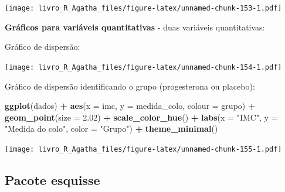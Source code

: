 \documentclass[
]{book}
\newenvironment{Shaded}{\begin{snugshade}}{\end{snugshade}}
\newcommand{\DataTypeTok}[1]{\textcolor[rgb]{0.13,0.29,0.53}{#1}}
\newcommand{\FloatTok}[1]{\textcolor[rgb]{0.00,0.00,0.81}{#1}}
\newcommand{\KeywordTok}[1]{\textcolor[rgb]{0.13,0.29,0.53}{\textbf{#1}}}
\newcommand{\NormalTok}[1]{#1}
\newcommand{\OperatorTok}[1]{\textcolor[rgb]{0.81,0.36,0.00}{\textbf{#1}}}
\newcommand{\StringTok}[1]{\textcolor[rgb]{0.31,0.60,0.02}{#1}}
\begin{document}
\texttt{[image: livro\_R\_Agatha\_files/figure-latex/unnamed-chunk-153-1.pdf]}

\textbf{Gráficos para variáveis quantitativas} - duas variáveis quantitativas:

Gráfico de dispersão:

\begin{Shaded}
\end{Shaded}

\texttt{[image: livro\_R\_Agatha\_files/figure-latex/unnamed-chunk-154-1.pdf]}

Gráfico de dispersão identificando o grupo (progesterona ou placebo):

\begin{Shaded}
\begin{Highlighting}[]
\KeywordTok{ggplot}\NormalTok{(dados) }\OperatorTok{+}
\StringTok{  }\KeywordTok{aes}\NormalTok{(}\DataTypeTok{x =}\NormalTok{ imc, }\DataTypeTok{y =}\NormalTok{ medida_colo, }\DataTypeTok{colour =}\NormalTok{ grupo) }\OperatorTok{+}
\StringTok{  }\KeywordTok{geom_point}\NormalTok{(}\DataTypeTok{size =} \FloatTok{2.02}\NormalTok{) }\OperatorTok{+}
\StringTok{  }\KeywordTok{scale_color_hue}\NormalTok{() }\OperatorTok{+}
\StringTok{  }\KeywordTok{labs}\NormalTok{(}\DataTypeTok{x =} \StringTok{"IMC"}\NormalTok{, }\DataTypeTok{y =} \StringTok{"Medida do colo"}\NormalTok{, }\DataTypeTok{color =} \StringTok{"Grupo"}\NormalTok{) }\OperatorTok{+}
\StringTok{  }\KeywordTok{theme_minimal}\NormalTok{()}
\end{Highlighting}
\end{Shaded}

\texttt{[image: livro\_R\_Agatha\_files/figure-latex/unnamed-chunk-155-1.pdf]}

\hypertarget{pacote-esquisse}{%
\subsection{Pacote esquisse}\label{pacote-esquisse}}
\end{document}
